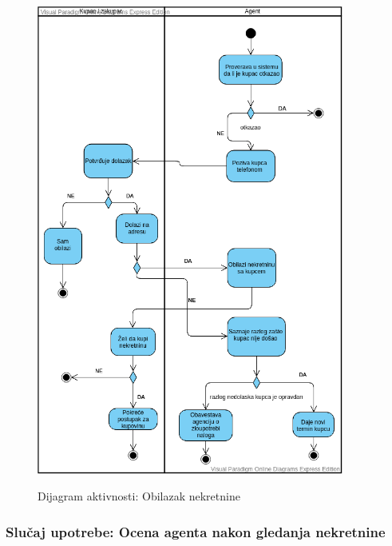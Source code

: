 \documentclass[20pt]{article}
\begin{document}
 
\newpage
\begin{figure}[h]
        \centering
        \includegraphics[width=0.9\textwidth,height=0.74\textheight]{Pictures/DijagramAktivnostiObilazakNekretnine.png}\\
        \caption{Dijagram aktivnosti: Obilazak nekretnine}
        \label{fig:dijagramAktivnostiObilazakNekretnine}
    \end{figure}
\newpage

\newpage
{}
\setlength{\parindent}{1cm}
\fontsize{13}{18} \selectfont 
\subsubsection{\bfseries \large Slu\v{c}aj upotrebe: Ocena agenta nakon gledanja nekretnine}
\end{document}

